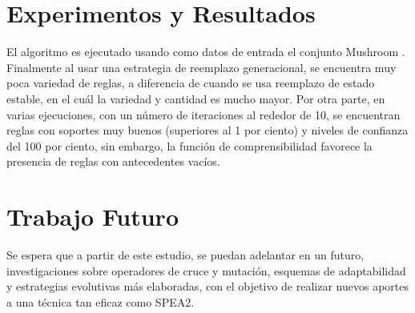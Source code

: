 \documentclass{llncs}
\begin{document}
\section{Experimentos y Resultados}
El algoritmo es ejecutado usando como datos de entrada el conjunto Mushroom \cite{Blake}. Finalmente al usar una estrategia de reemplazo generacional, se encuentra muy poca variedad de reglas, a diferencia de cuando se usa reemplazo de estado estable, en el cuál la variedad y cantidad es mucho mayor. 
Por otra parte, en varias ejecuciones, con un número de iteraciones al rededor de 10, se encuentran reglas con soportes muy buenos (superiores al 1 por ciento) y niveles de confianza del 100 por ciento, sin embargo, la función de comprensibilidad favorece la presencia de reglas con antecedentes vacíos.

\section{Trabajo Futuro}
Se espera que a partir de este estudio, se puedan adelantar en un futuro, investigaciones sobre operadores de cruce y mutación, esquemas de adaptabilidad y estrategias evolutivas más elaboradas, con el objetivo de realizar nuevos aportes a una técnica tan eficaz como SPEA2.
\end{document}
